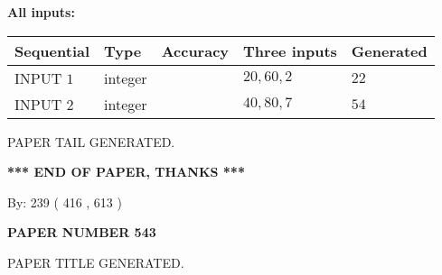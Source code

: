 \documentclass[12pt]{article}
\begin{document}
   
   
   
\noindent\vspace{0.1in}\hspace{-0.08in} {\textbf{\Large{All inputs: }}}
   
   
  
  
\noindent\begin{tabular}{|l|l|l|l|l|}
\hline
 Sequential & Type & Accuracy & Three inputs & Generated \\ 
\hline
 
 
  INPUT $  1 $ & integer &  & $
 20
 , 
 60
 , 
 2
 $ & $ 22 $ 
 \\  \hline  
 
 
  INPUT $  2 $ & integer &  & $
 40
 , 
 80
 , 
 7
 $ & $ 54 $ 
 \\  \hline  
 \end{tabular}
   
   
   
   
   
   
 \vspace{0.2in}
 
   
   
\vspace{2.0in} PAPER TAIL GENERATED.
   
   
   
   
\vspace{1.0in} 
{\textbf{\large{ *** END OF PAPER, THANKS *** }}} 
   
   
\hspace{1.0in} By: 
 239 ( 416 ,  613 )
   
   
   
   
\newpage 
\setcounter{page}{ 
   543001 } 
   
   
   
   
 {\textbf{ \Large{ PAPER NUMBER  543  }}}
   
   
\vspace{0.2in}
   
   
   
   
   
   
   
   
 \vspace{0.2in}
 
 
 
 
   
   
 PAPER TITLE GENERATED.
   
   
   
\vspace{0.2in}
   
\end{document}
